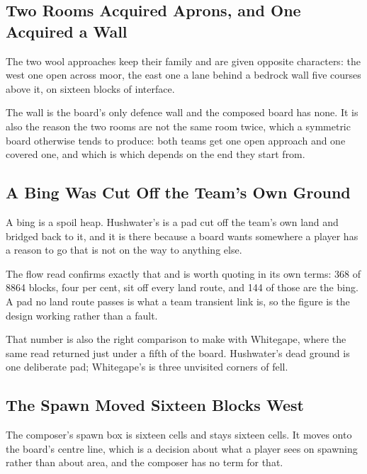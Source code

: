 \subsection{Two Rooms Acquired Aprons, and One Acquired a Wall}

The two wool approaches keep their  family and are given opposite
characters: the west one open across moor, the east one a lane behind a bedrock
wall five courses above it, on sixteen blocks of interface.

The wall is the board's only defence wall and the composed board has none. It is
also the reason the two rooms are not the same room twice, which a symmetric
board otherwise tends to produce: both teams get one open approach and one
covered one, and which is which depends on the end they start from.

\subsection{A Bing Was Cut Off the Team's Own Ground}

A bing is a spoil heap. Hushwater's is a pad cut off the team's own land and
bridged back to it, and it is there because a board wants somewhere a player
has a reason to go that is not on the way to anything else.

The flow read confirms exactly that and is worth quoting in its own terms: 368
of 8864 blocks, four per cent, sit off every land route, and 144 of those are
the bing. A pad no land route passes is what a team transient link is, so the
figure is the design working rather than a fault.

That number is also the right comparison to make with Whitegape, where the same
read returned just under a fifth of the board. Hushwater's dead ground is one
deliberate pad; Whitegape's is three unvisited corners of fell.

\subsection{The Spawn Moved Sixteen Blocks West}

The composer's spawn box is sixteen cells and stays sixteen cells. It moves onto
the board's centre line, which is a decision about what a player sees on
spawning rather than about area, and the composer has no term for that.

